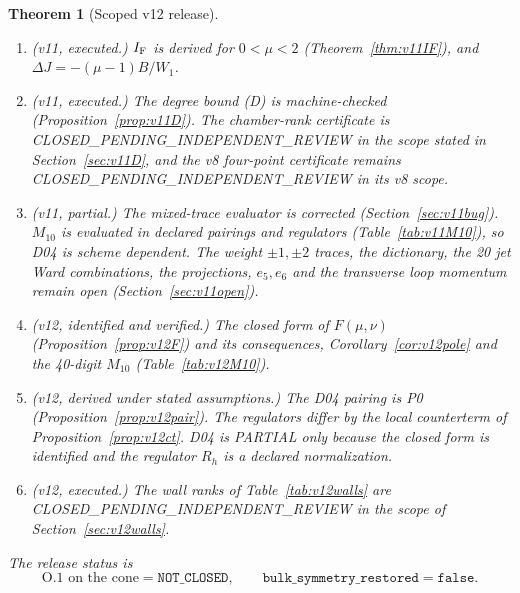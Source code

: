 \documentclass[11pt,a4paper]{article}
\newcommand{\PARTIAL}{\textsf{PARTIAL}}
\newcommand{\CPIR}{\textsf{CLOSED\_PENDING\_}\allowbreak\textsf{INDEPENDENT\_REVIEW}}
\newcommand{\NOTCLOSED}{\texttt{NOT\_CLOSED}}
\theoremstyle{plain}
\newtheorem{theorem}{Theorem}[section]
\theoremstyle{definition}
\theoremstyle{remark}
\numberwithin{equation}{section}
\begin{document}
\begin{theorem}[Scoped v12 release]
\begin{enumerate}[label=\textup{(\roman*)}]
\item \emph{(v11, executed.)} \(I_{\rm F}\) is derived for \(0<\mu<2\)
(Theorem~\ref{thm:v11IF}), and \(\Delta J=-(\mu-1)B/W_1\).

\item \emph{(v11, executed.)} The degree bound (D) is machine-checked
(Proposition~\ref{prop:v11D}). The chamber-rank certificate is
\CPIR{} in the scope stated in Section~\ref{sec:v11D}, and the v8
four-point certificate remains \CPIR{} in its v8 scope.

\item \emph{(v11, partial.)} The mixed-trace evaluator is corrected
(Section~\ref{sec:v11bug}). \(M_{10}\) is evaluated in declared
pairings and regulators (Table~\ref{tab:v11M10}), so D04 is
scheme dependent. The weight \(\pm1,\pm2\) traces, the
dictionary, the 20 jet Ward combinations, the projections,
\(e_5,e_6\) and the transverse loop momentum remain open
(Section~\ref{sec:v11open}).

\item \emph{(v12, identified and verified.)} The closed form of
\(F(\mu,\nu)\) (Proposition~\ref{prop:v12F}) and its consequences,
Corollary~\ref{cor:v12pole} and the 40-digit \(M_{10}\)
(Table~\ref{tab:v12M10}).

\item \emph{(v12, derived under stated assumptions.)} The D04
pairing is P0 (Proposition~\ref{prop:v12pair}). The regulators differ
by the local counterterm of Proposition~\ref{prop:v12ct}. D04 is
\PARTIAL{} only because the closed form is identified and the
regulator \(R_h\) is a declared normalization.

\item \emph{(v12, executed.)} The wall ranks of
Table~\ref{tab:v12walls} are \CPIR{} in the scope of
Section~\ref{sec:v12walls}.
\end{enumerate}
The release status is
\[
 \boxed{
 \text{O.1 on the cone}=\NOTCLOSED,\qquad
 \texttt{bulk\_symmetry\_restored}=\texttt{false}.
 }
\]
\end{theorem}
\end{document}
